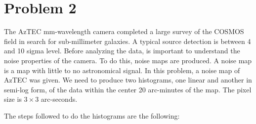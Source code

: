 \section*{Problem 2}

The AzTEC mm-wavelength camera completed a large survey of the COSMOS field in search for sub-millimeter galaxies. 
A typical source detection is between 4 and 10 sigma level. 
Before analyzing the data, is important to understand the noise properties of the camera. 
To do this, noise maps are produced. A noise map is a map with little to no astronomical signal. 
In this problem, a noise map of AzTEC was given. We need to produce two histograms, one linear and another in semi-log form, of the data within the center 20 arc-minutes of the map. 
The pixel size is $3 \times 3$ arc-seconds.

The steps followed to do the histograms are the following:

